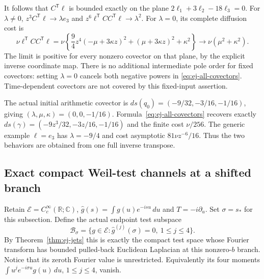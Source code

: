 It follows that $C^{\mathsf T}\ell$ is bounded exactly on the plane
$2\ell_1+3\ell_2-18\ell_3=0$. For $\lambda\ne0$,
$z^3C^{\mathsf T}\ell\to\lambda e_3$ and
$z^6\ell^{\mathsf T}CC^{\mathsf T}\ell\to\lambda^2$.
For $\lambda=0$, its complete diffusion cost is
\begin{equation}
 \nu\ell^{\mathsf T}CC^{\mathsf T}\ell
 =\nu\left\{\frac94z^4(-\mu+3\kappa z)^2
                    +(\mu+3\kappa z)^2+\kappa^2\right\}
 \longrightarrow\nu(\mu^2+\kappa^2).
 \label{eq:ej-plane-energy}
\end{equation}
The limit is positive for every nonzero covector on that plane,
by the explicit inverse coordinate map. There is no additional
intermediate pole order for fixed covectors: setting $\lambda=0$
cancels both negative powers in \eqref{eq:ej-all-covectors}.
Time-dependent covectors are not covered by this fixed-input assertion.

The actual initial arithmetic covector is
$ds(q_0)=(-9/32,-3/16,-1/16)$, giving
$(\lambda,\mu,\kappa)=(0,0,-1/16)$. Formula~\eqref{eq:ej-all-covectors}
recovers exactly $ds(\gamma)=(-9z^3/32,-3z/16,-1/16)$ and
the finite cost $\nu/256$. The generic example $\ell=e_3$ has
$\lambda=-9/4$ and cost asymptotic $81\nu z^{-6}/16$.
Thus the two behaviors are obtained from one full inverse transpose.

\subsection{Exact compact Weil-test channels at a shifted branch}

Retain $\mathcal E=C_c^\infty(\mathbb R;\mathbb C)$,
$\widehat g(s)=\int g(u)e^{-isu}\,du$ and $T=-i\partial_u$.
Set $\sigma=s_*$ for this subsection. Define the actual endpoint
test subspace
\[
 \mathcal B_\sigma=\{g\in\mathcal E:
                  \widehat g^{(j)}(\sigma)=0,\ 1\le j\le4\}.
\]
By Theorem~\ref{thm:ej-jets} this is exactly the compact test space
whose Fourier transform has bounded pulled-back Euclidean Laplacian
at this nonzero-$b$ branch. Notice that its zeroth Fourier value
is unrestricted. Equivalently its four moments
$\int u^j e^{-i\sigma u}g(u)\,du$, $1\le j\le4$, vanish.

